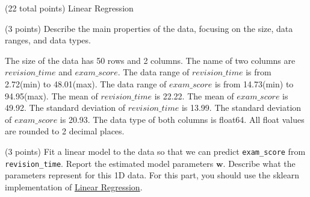 \documentclass[12pt]{article}
\begin{document}
\maketitle
\thispagestyle{empty}







\clearpage

\begin{question}{(22 total points) Linear Regression}




%
%
\begin{subquestion}{(3 points) Describe the main properties of the data, focusing on the size, data ranges, and data types.   
}


\begin{answerbox}{10em}
The size of the data has 50 rows and 2 columns. The name of two columns are $revision\_time$ and $exam\_score$. The data range of $revision\_time$ is from 2.72(min) to 48.01(max). The data range of $exam\_score$ is from 14.73(min) to 94.95(max). The mean of $revision\_time$ is 22.22. The mean of $exam\_score$ is 49.92. The standard deviation of $revision\_time$ is 13.99. The standard deviation of $exam\_score$ is 20.93. The data type of both columns is float64. All float values are rounded to 2 decimal places.
\end{answerbox}



\end{subquestion}




%
%
\begin{subquestion}{(3 points) Fit a linear model to the data so that we can predict \texttt{exam\_score} from \texttt{revision\_time}. 
Report the estimated model parameters $\mathbf{w}$. 
Describe what the parameters represent for this 1D data. 
For this part, you should use the sklearn implementation of \href{https://scikit-learn.org/0.19/modules/generated/sklearn.linear_model.LinearRegression.html}{Linear Regression}.\\
}



\end{subquestion}
\end{question}
\end{document}
